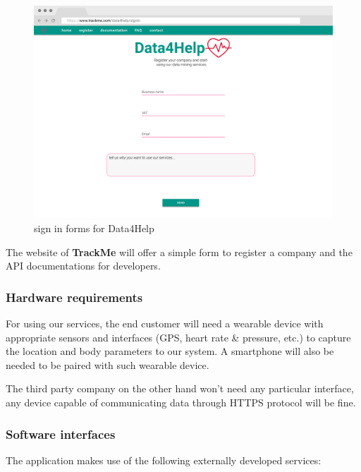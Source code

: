 \documentclass[../main.tex]{subfiles}
\begin{document}
\begin{figure}[H]
	\centering
	\includegraphics[scale=0.3]{images/mockup/webpage.png}
	\caption{sign in forms for Data4Help}
	\label{mockup_webpage}
\end{figure}
The website of \textbf{TrackMe} will offer a simple form to register a company and the API documentations for developers.

\subsubsection{Hardware requirements}

For using our services, the end customer will need a wearable device with appropriate sensors and interfaces (GPS, heart rate \& pressure, etc.) to capture the location and body parameters to our system. A smartphone will also be needed to be paired with such wearable device.

The third party company on the other hand won't need any particular interface, any device capable of communicating data through HTTPS protocol will be fine.

\subsubsection{Software interfaces}

The application makes use of the following externally developed services:
\end{document}
